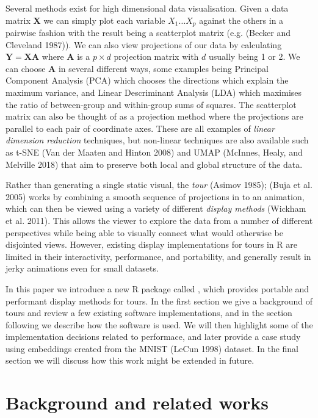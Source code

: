 Several methods exist for high dimensional data visualisation. Given a data matrix \(\mathbf X\) we can simply plot each variable \(X_1 \dots X_p\) against the others in a pairwise fashion with the result being a scatterplot matrix (e.g. (Becker and Cleveland 1987)). We can also view projections of our data by calculating \(\mathbf Y = \mathbf X \mathbf A\) where \(\mathbf A\) is a \(p \times d\) projection matrix with \(d\) usually being 1 or 2. We can choose \(\mathbf A\) in several different ways, some examples being Principal Component Analysis (PCA) which chooses the directions which explain the maximum variance, and Linear Descriminant Analysis (LDA) which maximises the ratio of between-group and within-group sums of squares. The scatterplot matrix can also be thought of as a projection method where the projections are parallel to each pair of coordinate axes. These are all examples of \emph{linear dimension reduction} techniques, but non-linear techniques are also available such as t-SNE (Van der Maaten and Hinton 2008) and UMAP (McInnes, Healy, and Melville 2018) that aim to preserve both local and global structure of the data.

Rather than generating a single static visual, the \emph{tour} (Asimov 1985); (Buja et al. 2005) works by combining a smooth sequence of projections in to an animation, which can then be viewed using a variety of different \emph{display methods} (Wickham et al. 2011). This allows the viewer to explore the data from a number of different perspectives while being able to visually connect what would otherwise be disjointed views. However, existing display implementations for tours in R are limited in their interactivity, performance, and portability, and generally result in jerky animations even for small datasets.

In this paper we introduce a new R package called , which provides portable and performant display methods for tours. In the first section we give a background of tours and review a few existing software implementations, and in the section following we describe how the software is used. We will then highlight some of the implementation decisions related to performace, and later provide a case study using embeddings created from the MNIST (LeCun 1998) dataset. In the final section we will discuss how this work might be extended in future.

\hypertarget{background-and-related-works}{%
\section{Background and related works}\label{background-and-related-works}}


